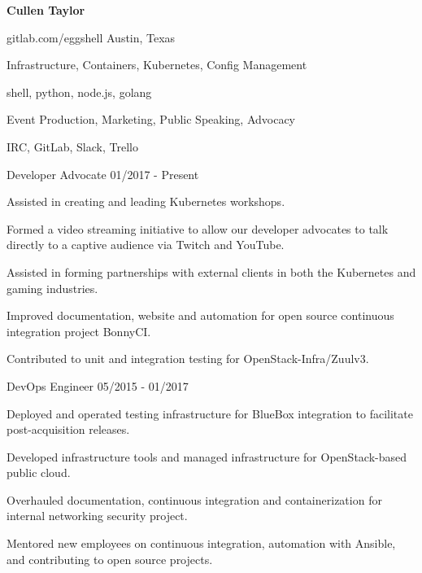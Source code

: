 \documentclass[12pt]{article} %
\begin{document}
\centerline{{\Huge \bf Cullen Taylor}}
\bigskip

        {gitlab.com/eggshell}
        {Austin, Texas}
        {}


      {Infrastructure, Containers, Kubernetes, Config Management}

      {shell, python, node.js, golang}

      {Event Production, Marketing, Public Speaking, Advocacy}

      {IRC, GitLab, Slack, Trello}


\begin{description}
{}
           {Developer Advocate}
           {01/2017 - Present}

Assisted in creating and leading Kubernetes workshops.

Formed a video streaming initiative to allow our developer advocates to talk
directly to a captive audience via Twitch and YouTube.

Assisted in forming partnerships with external clients in both the Kubernetes
and gaming industries.

Improved documentation, website and automation for open source continuous
integration project BonnyCI.

Contributed to unit and integration testing for OpenStack-Infra/Zuulv3.

           {DevOps Engineer}
           {05/2015 - 01/2017}

Deployed and operated testing infrastructure for BlueBox integration to
facilitate post-acquisition releases.

Developed infrastructure tools and managed infrastructure for OpenStack-based
public cloud.

Overhauled documentation, continuous integration and containerization for
internal networking security project.

Mentored new employees on continuous integration, automation with Ansible,
and contributing to open source projects.

\end{description}
\end{document}
